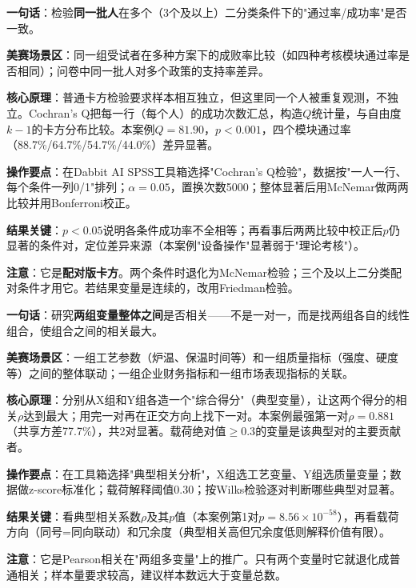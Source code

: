 
\begin{algobrief}
\textbf{一句话}：检验\textbf{同一批人}在多个（3个及以上）二分类条件下的"通过率/成功率"是否一致。

\textbf{美赛场景区}：同一组受试者在多种方案下的成败率比较（如四种考核模块通过率是否相同）；问卷中同一批人对多个政策的支持率差异。

\textbf{核心原理}：普通卡方检验要求样本相互独立，但这里同一个人被重复观测，不独立。Cochran's Q把每一行（每个人）的成功次数汇总，构造$Q$统计量，与自由度$k-1$的卡方分布比较。本案例$Q=81.90$，$p<0.001$，四个模块通过率（88.7\%/64.7\%/54.7\%/44.0\%）差异显著。

\textbf{操作要点}：在Dabbit AI SPSS工具箱选择"Cochran's Q检验"，数据按"一人一行、每个条件一列0/1"排列；$\alpha=0.05$，置换次数5000；整体显著后用McNemar做两两比较并用Bonferroni校正。

\textbf{结果关键}：$p<0.05$说明各条件成功率不全相等；再看事后两两比较中校正后$p$仍显著的条件对，定位差异来源（本案例"设备操作"显著弱于"理论考核"）。

\textbf{注意}：它是\textbf{配对版卡方}。两个条件时退化为McNemar检验；三个及以上二分类配对条件才用它。若结果变量是连续的，改用Friedman检验。
\end{algobrief}


\begin{algobrief}
\textbf{一句话}：研究\textbf{两组变量整体之间}是否相关——不是一对一，而是找两组各自的线性组合，使组合之间的相关最大。

\textbf{美赛场景区}：一组工艺参数（炉温、保温时间等）和一组质量指标（强度、硬度等）之间的整体联动；一组企业财务指标和一组市场表现指标的关联。

\textbf{核心原理}：分别从X组和Y组各造一个"综合得分"（典型变量），让这两个得分的相关$\rho$达到最大；用完一对再在正交方向上找下一对。本案例最强第一对$\rho=0.881$（共享方差77.7\%），共2对显著。载荷绝对值$\geq 0.3$的变量是该典型对的主要贡献者。

\textbf{操作要点}：在工具箱选择"典型相关分析"，X组选工艺变量、Y组选质量变量；数据做z-score标准化；载荷解释阈值0.30；按Wilks检验逐对判断哪些典型对显著。

\textbf{结果关键}：看典型相关系数$\rho$及其$p$值（本案例第1对$p=8.56\times10^{-58}$），再看载荷方向（同号=同向联动）和冗余度（典型相关高但冗余度低则解释价值有限）。

\textbf{注意}：它是Pearson相关在"两组多变量"上的推广。只有两个变量时它就退化成普通相关；样本量要求较高，建议样本数远大于变量总数。
\end{algobrief}

